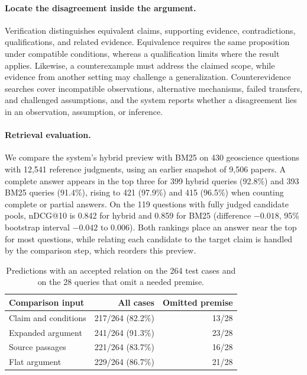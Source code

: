 \documentclass[sigconf,screen,review]{acmart}
\begin{document}
\paragraph{Locate the disagreement inside the argument.}
Verification distinguishes equivalent claims, supporting evidence, contradictions, qualifications, and related evidence. Equivalence requires the same proposition under compatible conditions, whereas a qualification limits where the result applies. Likewise, a counterexample must address the claimed scope, while evidence from another setting may challenge a generalization. Counterevidence searches cover incompatible observations, alternative mechanisms, failed transfers, and challenged assumptions, and the system reports whether a disagreement lies in an observation, assumption, or inference.

\paragraph{Retrieval evaluation.}
We compare the system's hybrid preview with BM25 on 430 geoscience questions with 12,541 reference judgments, using an earlier snapshot of 9,506 papers. A complete answer appears in the top three for 399 hybrid queries (92.8\%) and 393 BM25 queries (91.4\%), rising to 421 (97.9\%) and 415 (96.5\%) when counting complete or partial answers. On the 119 questions with fully judged candidate pools, nDCG@10 is 0.842 for hybrid and 0.859 for BM25 (difference $-0.018$, 95\% bootstrap interval $-0.042$ to $0.006$). Both rankings place an answer near the top for most questions, while relating each candidate to the target claim is handled by the comparison step, which reorders this preview.

\begin{table}[t]
\caption{Predictions with an accepted relation on the 264 test cases and on the 28 queries that omit a needed premise.}
\label{tab:comparison}
\centering
\begin{tabular}{@{}lrr@{}}
\toprule
Comparison input & All cases & Omitted premise\\
\midrule
Claim and conditions & 217/264 (82.2\%) & 13/28\\
Expanded argument & 241/264 (91.3\%) & 23/28\\
Source passages & 221/264 (83.7\%) & 16/28\\
Flat argument & 229/264 (86.7\%) & 21/28\\
\bottomrule
\end{tabular}
\end{table}
\end{document}
